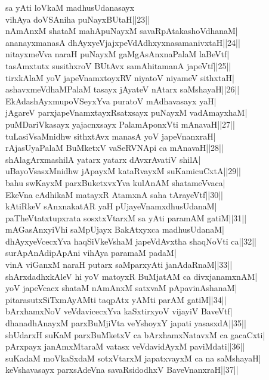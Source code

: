 \documentclass{article}
\begin{document}
sa yAti loVkaM madhusUdanasayx\\
vihAya doVSAniha puNayxBUtaH||23||\\
nAmAnxM shataM mahApuNayxM savaRpAtakashoVdhanaM|\\
ananayxmanasA dhAyxyeVjajxpeVdAdhxyxnasamanivxtaH||24||\\
nitayxmeVva naraH puNayxM gaMgAsAnxnaPalaM laBeVtf|\\
tasAmxtutx susithxroV BUtAvx samAhitamanA japeVtf||25||\\
tirxkAlaM yoV japeVnamxtoyxRV niyatoV niyameV sithxtaH|\\
ashavxmeVdhaMPalaM tasayx jAyateV nAtarx saMshayaH||26||\\
EkAdashAyxmupoVSeyxYva puratoV mAdhavasayx yaH|\\
jAgareV parxjapeVnamxtayxRsatxsayx puNayxM vadAmayxhaM|\\
puMDariVkasayx yajacnxsayx PalamAponxVti mAnavaH||27||\\
tuLasiVsaMnidhw sithxtAvx manasA yoV japeVnanxraH|\\
rAjasUyaPalaM BuMketxV vaSeRVNApi ca mAnavaH||28||\\
shAlagArxmashilA yatarx yatarx dAvxrAvatiV shilA|\\
uBayoVsasxMnidhw jApayxM kataRvayxM suKamicuCxtA||29||\\
bahu swKayxM parxBuketxvxYva kulAnAM shatameVvaca|\\
EkeVna cAdhikaM matayxR AtamxnA saha tArayeVtf||30||\\
kAtiRkeV sAnxnakatAR yaH pUjayeVnamxdhusUdanaM|\\
paTheVtatxtupxrata sosxtxVtarxM sa yAti paramAM gatiM||31||\\
mAGasAnxyiVhi saMpUjayx BakAtxyxca madhusUdanaM|\\
dhAyxyeVcecxYva haqSiVkeVshaM japeVdAvxtha shaqNoVti ca||32||\\
surApAnAdipApAni vihAya paramaM padaM|\\
vinA viGanxM naraH putarx saMparxyAti janAdaRnaM||33||\\
shArxdadhxkAleV hi yoV matoyxR BuMjatAM ca divxjanamxnAM|\\
yoV japeVcacx shataM nAmAnxM satxvaM pApavinAshanaM|\\
pitarasutxSiTxmAyAMti taqpAtx yAMti parAM gatiM||34||\\
bArxhamxNoV veVdavicecxYva kaSxtirxyoV vijayiV BaveVtf|\\
dhanadhAnayxM parxBuMjiVta veYshoyxY japati yasasxdA||35||\\
shUdarxH suKaM parxBuMketxV ca bArxhamxNatavxM ca gacaCxti|\\
pArxpayx janAmxMtaraM vatasx veVdavidAyxM paviMdati||36||\\
suKadaM moVkaSxdaM sotxVtarxM japatxvayxM ca na saMshayaH|\\
keVshavasayx parxsAdeVna savaRsidodhxV BaveVnanxraH||37||
\end{document}
